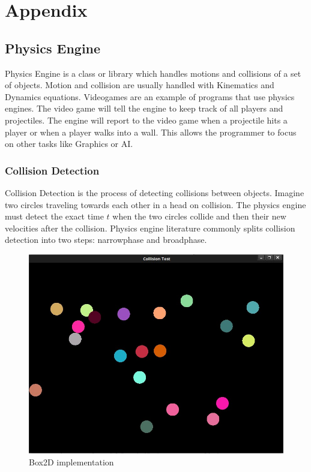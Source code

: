 \documentclass[conference]{IEEEtran}
\begin{document}
\section{Appendix}
	\subsection{Physics Engine}
	Physics Engine is a class or library which handles motions and collisions of a set of objects. Motion and collision are usually handled with Kinematics and Dynamics equations. Videogames are an example of programs that use physics engines. The video game will tell the engine to keep track of all players and projectiles. The engine will report to the video game when a projectile hits a player or when a player walks into a wall. This allows the programmer to focus on other tasks like Graphics or AI.

	\subsubsection{Collision Detection}
	Collision Detection is the process of detecting collisions between objects. Imagine two circles traveling towards each other in a head on collision. The physics engine must detect the exact time $t$ when the two circles collide and then their new velocities after the collision. Physics engine literature commonly splits collision detection into two steps: narrowphase and broadphase.

\begin{figure}[!h]
\centering
\includegraphics[scale=0.27]{collision}
\caption{Box2D implementation}
\label{fig_sim}
\end{figure}
\end{document}
